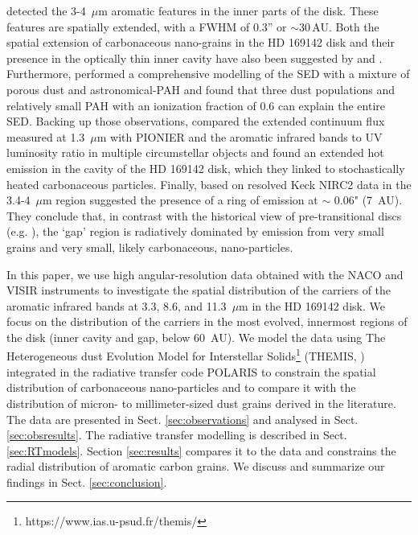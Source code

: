 \documentclass{aa}
\newcommand{\mic}{~$\mu$m\xspace}
\begin{document}
\citet{Habart2006,Bouteraon_032019} detected the 3-4\mic aromatic features in the inner parts of the disk. These features are spatially extended, with a FWHM of 0.3” or $\sim$30\,AU. 
Both the spatial extension of carbonaceous nano-grains in the HD 169142 disk and their presence in the optically thin inner cavity have also been suggested by \citet{Maaskant2014} and \cite{Seok_2016}. Furthermore, \citet{Seok_2016} performed a comprehensive modelling of the SED with a mixture of porous dust and astronomical-PAH and found that three dust populations and relatively small PAH with an ionization fraction of 0.6 can explain the entire SED. 
Backing up those observations, \citet{Klarmann2017} compared the extended continuum flux measured at 1.3\mic with PIONIER \citep{Lazareff2016} and the aromatic infrared bands to UV luminosity ratio in multiple circumstellar objects and found an extended hot emission in the cavity of the HD 169142 disk, which they linked to stochastically heated carbonaceous particles. 
Finally, based on resolved Keck NIRC2 data in the 3.4-4\mic region \citet{Birchall2019} suggested the presence of a ring of emission at $\sim$ 0.06" (7~AU). They conclude that, in contrast with the historical view of pre-transitional discs (e.g. \citet{Espaillat2007}), the ‘gap’ region is radiatively dominated by emission from very small grains and very small, likely carbonaceous, nano-particles. 

In this paper, we use high angular-resolution data obtained with the NACO and VISIR instruments to investigate the spatial distribution of the carriers of the aromatic infrared bands at 3.3, 8.6, and 11.3\mic in the HD 169142 disk. We focus on the distribution of the carriers in the most evolved, innermost regions of the disk (inner cavity and gap, below 60~AU). We model the data using The Heterogeneous dust Evolution Model for Interstellar Solids\footnote{https://www.ias.u-psud.fr/themis/} (THEMIS, \citet{Jones2017}) integrated in the radiative transfer code POLARIS \citep{Reissl2016} to constrain the spatial distribution of carbonaceous nano-particles and to compare it with the distribution of micron- to millimeter-sized dust grains derived in the literature. 
The data are presented in Sect. \ref{sec:observations} and analysed in Sect. \ref{sec:obsresults}. The radiative transfer modelling is described in Sect. \ref{sec:RTmodels}. Section \ref{sec:results} compares it to the data and constrains the radial distribution of aromatic carbon grains. We   discuss and summarize our findings in Sect. \ref{sec:conclusion}.
\end{document}
